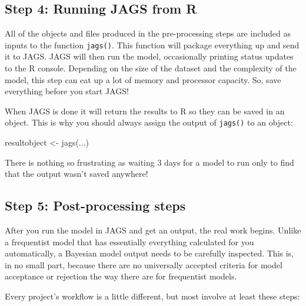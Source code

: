 \documentclass[
  13,
  letterpaper,
]{report}
\newenvironment{Shaded}{\begin{snugshade}}{\end{snugshade}}
\newcommand{\FunctionTok}[1]{\textcolor[rgb]{0.28,0.35,0.67}{#1}}
\newcommand{\NormalTok}[1]{\textcolor[rgb]{0.00,0.23,0.31}{#1}}
\newcommand{\OtherTok}[1]{\textcolor[rgb]{0.00,0.23,0.31}{#1}}
\begin{document}
\subsection{Step 4: Running JAGS from
R}\label{step-4-running-jags-from-r}

All of the objects and files produced in the pre-processing steps are
included as inputs to the function \texttt{jags()}. This function will
package everything up and send it to JAGS. JAGS will then run the model,
occasionally printing status updates to the R console. Depending on the
size of the dataset and the complexity of the model, this step can eat
up a lot of memory and processor capacity. So, save everything before
you start JAGS!

When JAGS is done it will return the results to R so they can be saved
in an object. This is why you should always assign the output of
\texttt{jags()} to an object:

\begin{Shaded}
\begin{Highlighting}[]
\NormalTok{resultobject }\OtherTok{\textless{}{-}} \FunctionTok{jags}\NormalTok{(...)}
\end{Highlighting}
\end{Shaded}

There is nothing so frustrating as waiting 3 days for a model to run
only to find that the output wasn't saved anywhere!

\subsection{Step 5: Post-processing
steps}\label{step-5-post-processing-steps}

After you run the model in JAGS and get an output, the real work begins.
Unlike a frequentist model that has essentially everything calculated
for you automatically, a Bayesian model output needs to be carefully
inspected. This is, in no small part, because there are no universally
accepted criteria for model acceptance or rejection the way there are
for frequentist models.

Every project's workflow is a little different, but most involve at
least these steps:
\end{document}
